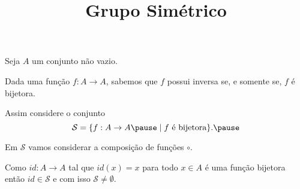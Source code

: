 \documentclass{beamer}
\title{Grupo Simétrico}
\author[\autor]{\autor}
\institute[\instituto]{\instituto}
\date{}
\begin{document}
    \begin{frame}
        \maketitle
    \end{frame}


    \begin{frame}
        Seja $A$ um conjunto n\~ao vazio.\pause

        \vspace{.3cm}

        Dada uma fun\c{c}\~ao $f : A \to A$, sabemos que $f$ possui inversa \pause se, e somente se, $f$ \'e bijetora.\pause

        \vspace{.3cm}

        Assim considere o conjunto\pause
        \[
            \mathcal{S} = \{ f : A \to A \pause \mid f \mbox{ \'e bijetora}\}.\pause
        \]

        Em $\mathcal{S}$ vamos considerar a composi\c{c}\~ao de fun\c{c}\~oes $\circ$.\pause

        \vspace{.3cm}

        Como $id : A \to A$ tal que $id(x) = x$ para todo $x \in A$ \pause \'e uma fun\c{c}\~ao bijetora \pause ent\~ao $id \in \mathcal{S}$ \pause e com isso $\mathcal{S} \ne \emptyset$.
    \end{frame}
\end{document}
